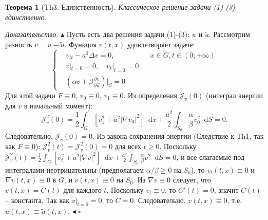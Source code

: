 \documentclass[12pt, a4paper]{article}
\newcommand{\dd}{\mathop{}\!\mathrm{d}} %
\newtheorem{theorem}{Теорема}[section] %
\newenvironment{proof}[1][\proofname]{\par\noindent\textit{#1.}\quad}{\hfill$\square$}
\renewcommand{\proofname}{Доказательство}
\begin{document}
\begin{theorem}[Th3. Единственность]
\label{thm:uniqueness}
Классическое решение задачи (1)-(3) единственно.
\end{theorem}
\begin{proof}
$\blacktriangle$ Пусть есть два решения задачи (1)-(3): $u$ и $\tilde{u}$. Рассмотрим разность $v = u - \tilde{u}$.
Функция $v(t,x)$ удовлетворяет задаче:
$$
\left\{
\begin{aligned}
&v_{tt} - a^2 \Delta v = 0, && x \in G, t \in (0;+\infty) \\
&v|_{t=0} = 0, \quad v_t|_{t=0} = 0 && \\
&\left(\alpha v + \beta \frac{\partial v}{\partial \vec{n}}\right)\Big|_S = 0 &&
\end{aligned}
\right.
$$
Для этой задачи $F \equiv 0$, $v_0 \equiv 0$, $v_1 \equiv 0$.
Из определения $\mathcal{J}_v(0)$ (интеграл энергии для $v$ в начальный момент):
$$ \mathcal{J}_v^2(0) = \frac{1}{2} \int_G [v_1^2 + a^2 |\nabla v_0|^2] \dd x + \frac{a^2}{2} \int_{S_0} \frac{\alpha}{\beta} v_0^2 \dd S = 0. $$
Следовательно, $\mathcal{J}_v(0)=0$.
Из закона сохранения энергии (Следствие к Th1, так как $F \equiv 0$): $\mathcal{J}_v^2(t) = \mathcal{J}_v^2(0) = 0$ для всех $t \ge 0$.
Поскольку $\mathcal{J}_v^2(t) = \frac{1}{2} \int_G [v_t^2 + a^2 |\nabla v|^2] \dd x + \frac{a^2}{2} \int_{S_0} \frac{\alpha}{\beta} v^2 \dd S = 0$,
и все слагаемые под интегралами неотрицательны (предполагаем $\alpha/\beta \ge 0$ на $S_0$), то $v_t(t,x) \equiv 0$ и $\nabla v(t,x) \equiv 0$ в $G$, и $v(t,x) \equiv 0$ на $S_0$.
Из $\nabla v \equiv 0$ следует, что $v(t,x) = C(t)$ для каждого $t$. Поскольку $v_t \equiv 0$, то $C'(t)=0$, значит $C(t)$ -- константа.
Так как $v|_{t=0}=0$, то $C=0$.
Следовательно, $v(t,x) \equiv 0$, т.е. $u(t,x) \equiv \tilde{u}(t,x)$. $\blacktriangleleft$
\end{proof}
\end{document}
